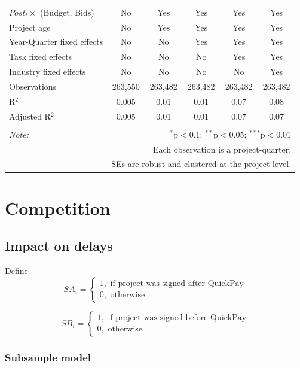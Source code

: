 \documentclass[
]{article}
\begin{document}
\begin{table}[H]
\begin{tabular}{@{\extracolsep{-2pt}}lccccc}
$Post_t \times $  (Budget, Bids) & No & Yes & Yes & Yes & Yes \\ 
Project age & No & Yes & Yes & Yes & Yes \\ 
Year-Quarter fixed effects & No & No & Yes & Yes & Yes \\ 
Task fixed effects & No & No & No & Yes & Yes \\ 
Industry fixed effects & No & No & No & No & Yes \\ 
Observations & 263,550 & 263,482 & 263,482 & 263,482 & 263,482 \\ 
R$^{2}$ & 0.005 & 0.01 & 0.01 & 0.07 & 0.08 \\ 
Adjusted R$^{2}$ & 0.005 & 0.01 & 0.01 & 0.07 & 0.07 \\ 
\hline 
\hline \\[-1.8ex] 
\textit{Note:}  & \multicolumn{5}{r}{$^{*}$p$<$0.1; $^{**}$p$<$0.05; $^{***}$p$<$0.01} \\ 
 & \multicolumn{5}{r}{Each observation is a project-quarter.} \\ 
 & \multicolumn{5}{r}{SEs are robust and clustered at the project level.} \\ 
\end{tabular} 
\end{table}

\hypertarget{competition}{%
\section{Competition}\label{competition}}

\hypertarget{impact-on-delays}{%
\subsection{Impact on delays}\label{impact-on-delays}}

Define
\[ SA_i = \begin{cases} 1, \text{ if project was signed after QuickPay}\\
0, \text{ otherwise} \end{cases}\]

\[ SB_i = \begin{cases} 1, \text{ if project was signed before QuickPay}\\
0, \text{ otherwise} \end{cases}\]

\hypertarget{subsample-model}{%
\subsubsection{Subsample model}\label{subsample-model}}
\end{document}
